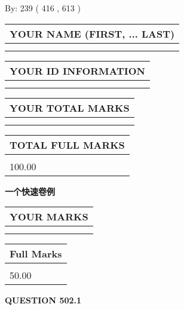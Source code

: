 \documentclass{ctexart}
\begin{document}
   
\hspace{1.0in} By: 
 239 ( 416 ,  613 )
   
   
   
   
\newpage 
\setcounter{page}{ 
   502001 } 
   
   
   
   
\noindent\begin{tabular}{|l|}
\hline
YOUR NAME (FIRST, ... LAST)  \\
\hline
 \\ 
 \\ 
\hline
\end{tabular}
\hspace{0.05in} \begin{tabular}{|l|}
\hline
 YOUR   ID   INFORMATION  \\
\hline
 \\ 
 \\ 
\hline
\end{tabular}
   
   
\vspace{0.2in}\noindent\begin{tabular}{|l|}
\hline
YOUR TOTAL MARKS  \\
\hline
 \\ 
 \\ 
\hline
\end{tabular}
\hspace{0.05in} \begin{tabular}{|l|}
\hline
TOTAL FULL MARKS  \\
\hline
 \\ 
100.00 \\
\hline
\end{tabular}
   
   
 \vspace{0.2in}
{\LARGE {\textbf{ 一个快速卷例}}}
   
   
  
\vspace{0.2in}
  
\noindent\begin{tabular}{|l|}
\hline
 YOUR MARKS  \\
\hline
 \\ 
 \\ 
\hline
\end{tabular}
\hspace{0.05in} \begin{tabular}{|l|}
\hline
 Full Marks  \\
\hline
 \\ 
50.00 \\
\hline
\end{tabular}
{\textbf{\Large{QUESTION
502.1 
}}}
  
\end{document}
